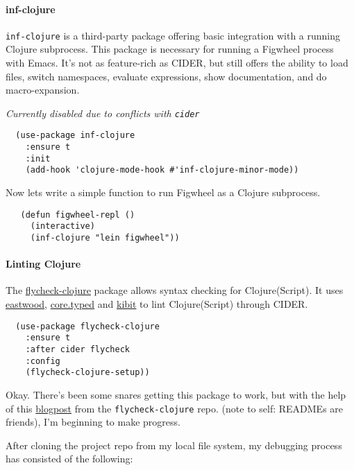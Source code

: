 \documentclass[11pt]{article}
\begin{document}
\paragraph*{inf-clojure}
\label{sec:orgff98f24}

\texttt{inf-clojure} is a third-party package offering basic integration
with a running Clojure subprocess. This package is necessary for
running a Figwheel process with Emacs.
It's not as feature-rich as CIDER, but still offers the ability
to load files, switch namespaces, evaluate expressions, show documentation,
and do macro-expansion.

\emph{Currently disabled due to conflicts with \texttt{cider}}

\begin{verbatim}
  (use-package inf-clojure
    :ensure t
    :init
    (add-hook 'clojure-mode-hook #'inf-clojure-minor-mode))
\end{verbatim}

Now lets write a simple function to run Figwheel as a Clojure
subprocess.

\begin{verbatim}
   (defun figwheel-repl ()
     (interactive)
     (inf-clojure "lein figwheel"))
\end{verbatim}

\paragraph*{Linting Clojure}
\label{sec:org9d39366}

The \href{https://github.com/clojure-emacs/squiggly-clojure}{flycheck-clojure} package allows syntax checking for Clojure(Script).
It uses \href{https://github.com/jonase/eastwood}{eastwood}, \href{http://typedclojure.org/}{core.typed} and \href{https://github.com/jonase/kibit}{kibit} to lint Clojure(Script) through CIDER.


\begin{verbatim}
  (use-package flycheck-clojure
    :ensure t
    :after cider flycheck
    :config
    (flycheck-clojure-setup))
\end{verbatim}

Okay. There's been some snares getting this package to work, but with
the help of this \href{http://blog.podsnap.com/squiggly.html}{blogpost} from the \texttt{flycheck-clojure} repo. (note to
self: READMEs are friends), I'm beginning to make progress.

After cloning the project repo from my local file system, my debugging
process has consisted of the following:
\end{document}

